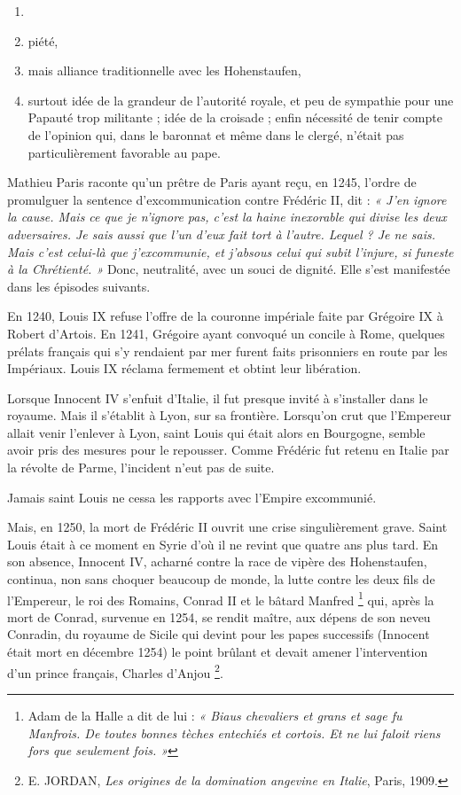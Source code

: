 \documentclass[french,twoside]{book} %
\begin{document}
\begin{enumerate}[itemsep=0pt,]
\item[] \hspace{-1.5em}{\bfseries L’attitude de saint Louis :}
\item piété,
\item mais alliance traditionnelle avec les Hohenstaufen,
\item surtout idée de la grandeur de l’autorité royale, et peu de sympathie pour une Papauté trop militante ; idée de la croisade ; enfin nécessité de tenir compte de l’opinion qui, dans le baronnat et même dans le clergé, n’était pas particulièrement favorable au pape.

\end{enumerate}\noindent Mathieu Paris raconte qu’un prêtre de Paris ayant reçu, en 1245, l’ordre de promulguer la sentence d’excommunication contre Frédéric II, dit : \emph{« J’en ignore la cause. Mais ce que je n’ignore pas, c’est la haine inexorable qui divise les deux adversaires. Je sais aussi que l’un d’eux fait tort à l’autre. Lequel ? Je ne sais. Mais c’est celui-là que j’excommunie, et j’absous celui qui subit l’injure, si funeste à la Chrétienté. »} Donc, neutralité, avec un souci de dignité. Elle s’est manifestée dans les épisodes suivants.\par
En 1240, Louis IX refuse l’offre de la couronne impériale faite par Grégoire IX à Robert d’Artois. En 1241, Grégoire ayant convoqué un concile à Rome, quelques prélats français qui s’y rendaient par mer furent faits prisonniers en route par les Impériaux. Louis IX réclama fermement et obtint leur libération.\par
Lorsque Innocent IV s’enfuit d’Italie, il fut presque invité à s’installer dans le royaume. Mais il s’établit à Lyon, sur sa frontière. Lorsqu’on crut que l’Empereur allait venir l’enlever à Lyon, saint Louis qui était alors en Bourgogne, semble avoir pris des mesures pour le repousser. Comme Frédéric fut retenu en Italie par la révolte de Parme, l’incident n’eut pas de suite.\par
Jamais saint Louis ne cessa les rapports avec l’Empire excommunié.\par
Mais, en 1250, la mort de Frédéric II ouvrit une crise singulièrement grave. Saint Louis était à ce moment en Syrie d’où il ne revint que quatre ans plus tard. En son absence, Innocent IV, acharné contre la race de vipère des Hohenstaufen, continua, non sans choquer beaucoup de monde, la lutte contre les deux fils de  
\label{p31} l’Empereur, le roi des Romains, Conrad II et le bâtard Manfred \footnote{Adam de la Halle a dit de lui : \emph{« Biaus chevaliers et grans et sage fu Manfrois. De toutes bonnes tèches entechiés et cortois. Et ne lui faloit riens fors que seulement fois. »}} qui, après la mort de Conrad, survenue en 1254, se rendit maître, aux dépens de son neveu Conradin, du royaume de Sicile qui devint pour les papes successifs (Innocent était mort en décembre 1254) le point brûlant et devait amener l’intervention d’un prince français, Charles d’Anjou \footnote{ E. JORDAN, {\itshape Les origines de la domination angevine en Italie}, Paris, 1909.}.\par
\end{document}
